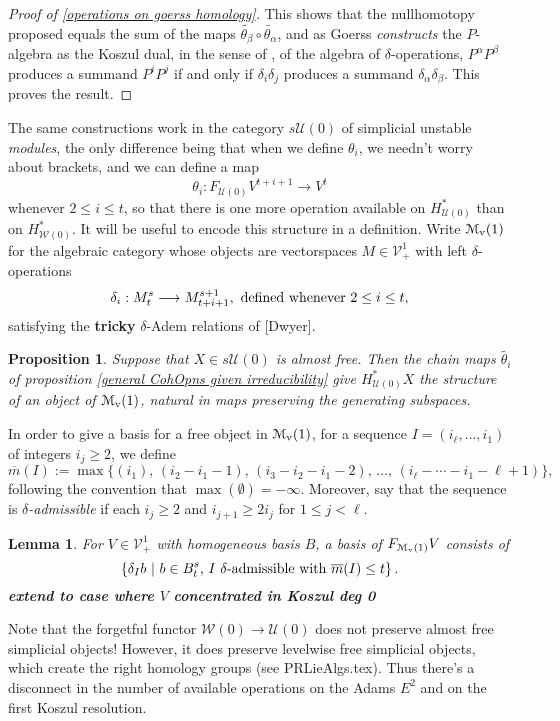 \documentclass[11pt]{amsart}
\theoremstyle{plain}
\newtheorem{lem}[thm]{Lemma}
\newtheorem{prop}[thm]{Proposition}
\theoremstyle{definition}
\renewcommand{\to}{\longrightarrow}
\newcommand{\calW}{\mathcal{W}}
\newcommand{\calU}{\mathcal{U}}
\newcommand{\calV}{\mathcal{V}}
\newcommand{\calMv}{\mathcal{M}_\textup{v}}
\theoremstyle{plain}
\newcommand{\vect}[2]{\calV^{#1}_{#2}}
\newcommand{\minDimP}{\overline{m}}
\begin{document}
\begin{Cohomology operations for all unstable Lie algebras}
\begin{proof}[Proof of \ref{operations on goerss homology}]
This shows that the nullhomotopy proposed equals the sum of the maps $\widetilde{\theta_\beta}\circ\widetilde{\theta_\alpha}$, and as Goerss \cite{MR1089001} \emph{constructs} the $P$-algebra as the Koszul dual, in the sense of \cite{PriddyKoszul.pdf}, of the algebra of $\delta$-operations, $P^{\alpha }P^{\beta}$ produces a summand $P^iP^j$ if and only if $\delta_i\delta_j$ produces a summand $\delta_{\alpha }\delta_{\beta}$. This proves the result.
\end{proof}
The same constructions work in the category $s\calU(0)$ of simplicial unstable \emph{modules}, the only difference being that when we define $\theta_i$, we needn't worry about brackets, and we can define a map
\[\theta_i:F_{\calU(0)}V^{t+i+1}\to V^t\]
whenever $2\leq i\leq t$, so that there is one more operation available on $H^*_{\calU(0)}$ than on $H^*_{\calW(0)}$. It will be useful to encode this structure in a definition. Write $\calMv(1)$ for the algebraic category whose objects are vectorspaces $M\in\vect{1}{+}$ with left $\delta$-operations
\[\delta_i:M^{s}_t\to M^{s+1}_{t+i+1},\textup{ defined whenever $2\leq i\leq t$,}\]
satisfying the \textbf{tricky} $\delta$-Adem relations of [Dwyer].
\begin{prop}\label{operations on untable P homology}
Suppose that $X\in s\calU(0)$ is almost free. Then the chain maps $\widetilde{\theta_i}$ of proposition \ref{general CohOpns given irreducibility} give $H^*_{\calU(0)}X$ the structure of an object of $\calMv(1)$, natural in maps preserving the generating subspaces.
\end{prop}
In order to give a basis for a free object in $\calMv(1)$, for a sequence $I=(i_\ell,\ldots,i_1)$ of integers $i_j\geq2$, we define
\[\minDimP(I):=\max\{(i_1),\,(i_2-i_1-1),\,(i_3-i_2-i_1-2),\,\ldots,\,(i_{\ell}-\cdots-i_1-\ell+1)\},
\]
following the convention that $\max(\emptyset)=-\infty$. Moreover, say that the sequence is \emph{$\delta$-admissible} if each $i_j\geq2$ and  $i_{j+1}\geq 2i_j$ for $1\leq j <\ell$.
\begin{lem}\label{basis of element of M(0)}
For $V\in\vect{1}{+}$ with homogeneous basis $B$, a basis of $F_{\calMv(1)}V$ consists of
\[\left\{\delta_Ib\ \middle|\ b\in B^{s}_t\textup{, $I$ $\delta$-admissible with }\minDimP(I)\leq t\right\}.\]
\textbf{extend to case where $V$ concentrated in Koszul deg 0}\end{lem}
\begin{shaded}
Note that the forgetful functor $\calW(0)\to\calU(0)$ does not preserve almost free simplicial objects! However, it does preserve levelwise free simplicial objects, which create the right homology groups (see PRLieAlgs.tex). Thus there's a disconnect in the number of available operations on the Adams $E^2$ and on the first Koszul resolution.
\end{shaded}


\end{Cohomology operations for all unstable Lie algebras}
\end{document}
